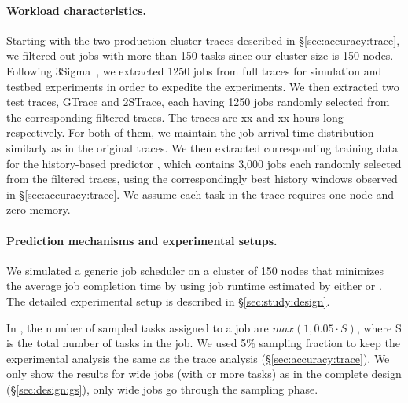 \paragraph{Workload characteristics.}
{Starting with the two production cluster traces described in
  \S\ref{sec:accuracy:trace}, we filtered out jobs with more than 150
  tasks since our cluster size is 150 nodes.
Following 3Sigma~\cite{3Sigma}, we extracted 1250 jobs from full traces for simulation
and testbed experiments in order to expedite the experiments.
% 
We then extracted two test traces, GTrace and 2STrace, each having
1250 jobs randomly selected from the corresponding filtered
traces. The traces are xx and xx hours long respectively.  For
both of them, we maintain the job arrival time distribution similarly
as in the original traces.  We then extracted corresponding training
data for the history-based predictor \primarybasepredict, which
contains 3,000 jobs each randomly selected from the filtered traces,
using the correspondingly best history windows observed in
\S\ref{sec:accuracy:trace}.
\rm{We assume each task in the trace requires one node and zero memory.}
\fi


\paragraph{Prediction mechanisms and experimental setups.}
We simulated a generic job scheduler on a cluster of 150 nodes
that minimizes the average job completion time by using
job runtime estimated by either \lTechnique or \primarybasepredict.
The detailed experimental setup is described in \S\ref{sec:study:design}.

In \lTechnique, the number of sampled tasks assigned to a job are
$max(1, 0.05 \cdot S)$, where S is the total number of tasks in the
job. We used 5\% sampling fraction to keep the experimental analysis
the same as the trace analysis
(\S\ref{sec:accuracy:trace}). {We only show the results for wide
  jobs (with \thinLimit or more tasks) as in the complete \slearn design (\S\ref{sec:design:gs}), only
  wide jobs go through the sampling phase.
  }

}
